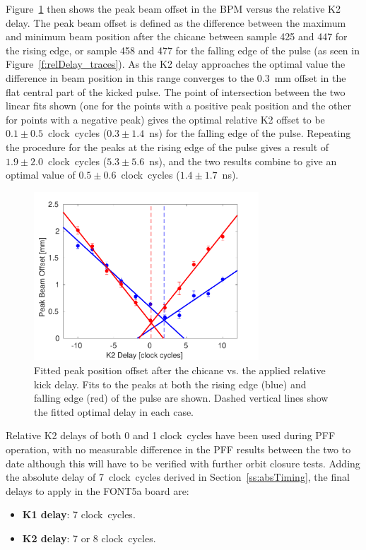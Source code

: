 Figure~\ref{f:relDelay_fit} then shows the peak beam offset in the BPM versus the relative K2 delay. The peak beam offset is defined as the difference between the maximum and minimum beam position after the chicane between sample 425 and 447 for the rising edge, or sample 458 and 477 for the falling edge of the pulse (as seen in Figure~\ref{f:relDelay_traces}). As the K2 delay approaches the optimal value the difference in beam position in this range converges to the 0.3~mm offset in the flat central part of the kicked pulse. The point of intersection between the two linear fits shown (one for the points with a positive peak position and the other for points with a negative peak) gives the optimal relative K2 offset to be \(0.1\pm0.5\)~clock~cycles (\(0.3\pm1.4\)~ns) for the falling edge of the pulse. Repeating the procedure for the peaks at the rising edge of the pulse gives a result of \(1.9\pm2.0\)~clock~cycles (\(5.3\pm5.6\)~ns), and the two results combine to give an optimal value of \(0.5\pm0.6\)~clock~cycles (\(1.4\pm1.7\)~ns).

\begin{figure}
  \centering
  \includegraphics[width=0.75\textwidth]{Figures/commissioning/relDelay_fit}
  \caption{Fitted peak position offset after the chicane vs. the applied relative kick delay. Fits to the peaks at both the rising edge (blue) and falling edge (red) of the pulse are shown. Dashed vertical lines show the fitted optimal delay in each case.}
  \label{f:relDelay_fit}
\end{figure}

Relative K2 delays of both 0 and 1 clock~cycles have been used during PFF operation, with no measurable difference in the PFF results between the two to date although this will have to be verified with further orbit closure tests. Adding the absolute delay of 7~clock~cycles derived in Section~\ref{ss:absTiming}, the final delays to apply in the FONT5a board are:
\begin{itemize}
\item \textbf{K1 delay}: 7 clock~cycles.
\item \textbf{K2 delay}: 7 or 8 clock~cycles.
\end{itemize}

%
%
%
%
